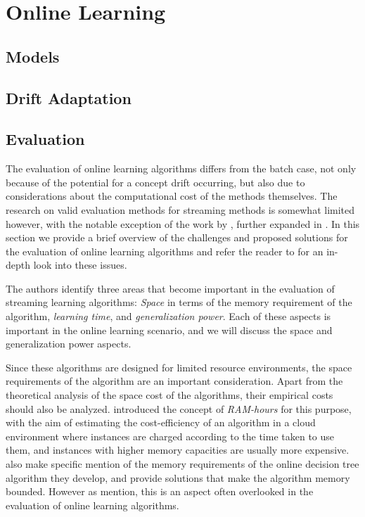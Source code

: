 \chapter{Online Learning}

\section{Models}

\section{Drift Adaptation}

\section{Evaluation}

The evaluation of online learning algorithms differs from the batch
case, not only because of the potential for a concept drift occurring,
but also due to considerations about the computational cost of the
methods themselves. The research on valid evaluation methods for
streaming methods is somewhat limited however, with the notable exception
of the work by \citet{online-evaluation-kdd}, further expanded in
\cite{online-evaluation-journal}.
In this section we provide
a brief overview of the challenges and proposed solutions for
the evaluation of online learning algorithms and refer the
reader to \cite{online-evaluation-journal} for an in-depth look
into these issues.

The authors identify three areas that
become important in the evaluation of streaming learning
algorithms: \emph{Space} in terms of the memory requirement of the algorithm, \emph{learning time}, and \emph{generalization power}.
Each of these aspects is important in the online learning scenario, and
we will discuss the space and generalization power aspects.


Since these algorithms are designed for limited resource environments,
the space requirements of the algorithm are an important consideration.
Apart from the theoretical analysis of the space cost of the algorithms,
their empirical costs should also be analyzed. \citet{ram-hours} introduced
the concept of \emph{RAM-hours} for this purpose, with the aim of estimating
the cost-efficiency of an algorithm in a cloud environment where instances
are charged according to the time taken to use them, and instances with
higher memory capacities are usually more expensive. \citet{vfdt} also
make specific mention of the memory requirements of the online decision
tree algorithm they develop, and provide solutions that make the algorithm
memory bounded. However as \citet{online-evaluation-journal} mention, this
is an aspect often overlooked in the evaluation of online learning
algorithms.

